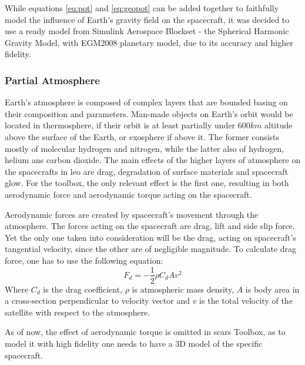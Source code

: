         While equations \eqref{eq:pot} and \eqref{eq:geopot} can be added together to faithfully model the influence of Earth's gravity field on the spacecraft, it was decided to use a ready model from Simulink Aerospace Blockset - the Spherical Harmonic Gravity Model, with EGM2008 planetary model, due to its accuracy and higher fidelity.


    \subsubsection{Partial Atmosphere}\label{toolbox:atmosphere}
        Earth's atmosphere is composed of complex layers that are bounded basing on their composition and parameters. Man-made objects on Earth's orbit would be located in thermosphere, if their orbit is at least partially under $600km$ altitude above the surface of the Earth, or exosphere if above it. The former consists mostly of molecular hydrogen and nitrogen, while the latter also of hydrogen, helium ans carbon dioxide. The main effects of the higher layers of atmosphere on the spacecrafts in \ac{leo} are drag, degradation of surface materials and spacecraft glow. For the toolbox, the only relevant effect is the first one, resulting in both aerodynamic force and aerodynamic torque acting on the spacecraft.

        Aerodynamic forces are created by spacecraft's movement through the atmosphere. The forces acting on the spacecraft are drag, lift and side slip force. Yet the only one taken into consideration will be the drag, acting on spacecraft's tangential velocity, since the other are of negligible magnitude. To calculate drag force, one has to use the following equation:
        \begin{equation}
            F_d = -\frac{1}{2}\rho C_d A v^2
        \end{equation}
        Where $C_d$ is the drag coefficient, $\rho$ is atmospheric mass density, $A$ is body area in a cross-section perpendicular to velocity vector and $v$ is the total velocity of the satellite with respect to the atmosphere.

        As of now, the effect of aerodynamic torque is omitted in \ac{scars} Toolbox, as to model it with high fidelity one needs to have a 3D model of the specific spacecraft.

